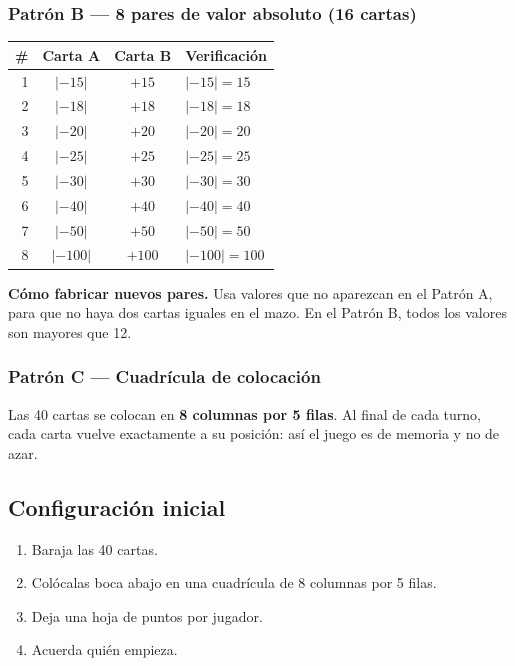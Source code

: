 \documentclass[12pt, letterpaper]{article}
\newcommand{\abs}[1]{\lvert #1\rvert}
\begin{document}
\subsubsection{Patrón B — 8 pares de valor absoluto (16 cartas)}

\begin{center}
\small
\begin{tabular}{@{}r c c l@{}}
\toprule
\textbf{\#} & \textbf{Carta A} & \textbf{Carta B} & \textbf{Verificación}\\
\midrule
1 & $\abs{-15}$ & $+15$ & $\abs{-15}=15$\\
2 & $\abs{-18}$ & $+18$ & $\abs{-18}=18$\\
3 & $\abs{-20}$ & $+20$ & $\abs{-20}=20$\\
4 & $\abs{-25}$ & $+25$ & $\abs{-25}=25$\\
5 & $\abs{-30}$ & $+30$ & $\abs{-30}=30$\\
6 & $\abs{-40}$ & $+40$ & $\abs{-40}=40$\\
7 & $\abs{-50}$ & $+50$ & $\abs{-50}=50$\\
8 & $\abs{-100}$ & $+100$ & $\abs{-100}=100$\\
\bottomrule
\end{tabular}
\end{center}

\begin{cuadroadvertencia}
\textbf{Cómo fabricar nuevos pares.} Usa valores que no aparezcan en el Patrón A, para que no haya dos cartas iguales en el mazo. En el Patrón B, todos los valores son mayores que 12.
\end{cuadroadvertencia}

\subsubsection{Patrón C — Cuadrícula de colocación}

Las 40 cartas se colocan en \textbf{8 columnas por 5 filas}. Al final de cada turno, cada carta vuelve exactamente a su posición: así el juego es de memoria y no de azar.

\subsection{Configuración inicial}

\begin{enumerate}[leftmargin=*]
  \item Baraja las 40 cartas.
  \item Colócalas boca abajo en una cuadrícula de 8 columnas por 5 filas.
  \item Deja una hoja de puntos por jugador.
  \item Acuerda quién empieza.
\end{enumerate}
\end{document}
